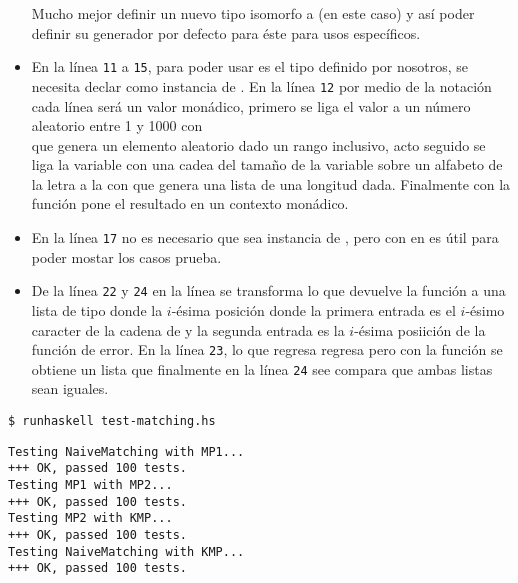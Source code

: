 \begin{itemize}
Mucho mejor definir un nuevo tipo isomorfo a (en este caso)  y así poder definir
su generador por defecto para éste para usos específicos.
\item En la línea \texttt{11} a \texttt{15}, para poder usar  es el tipo
 definido por nosotros, se necesita declar como instancia de .
En la línea \texttt{12} por medio de la notación  cada línea será un valor monádico,
primero se liga el valor  a un número aleatorio entre 1 y 1000 con\\
 que genera un elemento aleatorio dado un rango
inclusivo, acto seguido se liga la variable  con una cadea del tamaño de la variable
 sobre un alfabeto de la letra  a la  con
 que genera una lista de una longitud dada. Finalmente
con la función  pone el resultado en un contexto monádico.
\item En la línea \texttt{17} no es necesario que sea instancia de , pero con
 en  es útil para poder mostar los casos prueba.
\item De la línea \texttt{22} y \texttt{24}
en la línea se transforma lo que devuelve la función  a una lista de tipo
 donde la $i$-ésima posición donde la primera entrada es el $i$-ésimo caracter
de la cadena de  y la segunda entrada es la $i$-ésima posiición de la función de error.
En la línea \texttt{23}, lo que regresa  regresa
 pero con la función  se obtiene un lista que finalmente
en la línea \texttt{24} see compara que ambas listas sean iguales.
\end{itemize}


\texttt{\$ runhaskell test-matching.hs}

\begin{verbatim}
Testing NaiveMatching with MP1...
+++ OK, passed 100 tests.
Testing MP1 with MP2...
+++ OK, passed 100 tests.
Testing MP2 with KMP...
+++ OK, passed 100 tests.
Testing NaiveMatching with KMP...
+++ OK, passed 100 tests.
\end{verbatim}

